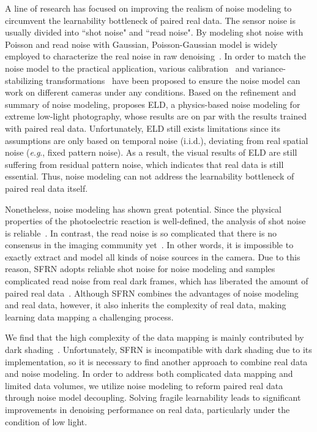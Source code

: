 \documentclass[sigconf,screen,nonacm]{acmart}
\newcommand{\eg}{\textit{e}.\textit{g}.}
\begin{document}
A line of research has focused on improving the realism of noise modeling to circumvent the learnability bottleneck of paired real data.
The sensor noise is usually divided into ``shot noise" and ``read noise".
By modeling shot noise with Poisson and read noise with Gaussian, Poisson-Gaussian model is widely employed to characterize the real noise in raw denoising~\cite{P-G}.
In order to match the noise model to the practical application, various calibration~\cite{EMVA1288,TPAMI94/CCD,P-G} and variance-stabilizing transformations~\cite{TIP11/VST,TIP13/VST} have been proposed to ensure the noise model can work on different cameras under any conditions.
Based on the refinement and summary of noise modeling, \citeauthor{CVPR20/ELD} proposes ELD, a physics-based noise modeling for extreme low-light photography, whose results are on par with the results trained with paired real data.
Unfortunately, ELD still exists limitations since its assumptions are only based on temporal noise (i.i.d.), deviating from real spatial noise (\eg, fixed pattern noise).
As a result, the visual results of ELD are still suffering from residual pattern noise, which indicates that real data is still essential.
Thus, noise modeling can not address the learnability bottleneck of paired real data itself.

Nonetheless, noise modeling has shown great potential.
Since the physical properties of the photoelectric reaction is well-defined, the analysis of shot noise is reliable~\cite{SPIE85/CCD,TPAMI94/CCD,EMVA1288}. In contrast, the read noise is so complicated that there is no consensus in the imaging community yet~\cite{SPIE04/imaging,TED07/CMOS,EMVA1288,arxiv2014/CMOS,TIP14/FPNR}.
In other words, it is impossible to exactly extract and model all kinds of noise sources in the camera.
Due to this reason, SFRN adopts reliable shot noise for noise modeling and samples complicated read noise from real dark frames, which has liberated the amount of paired real data~\cite{ICCV21/SFRN}.
Although SFRN combines the advantages of noise modeling and real data, however, it also inherits the complexity of real data, making learning data mapping a challenging process.

We find that the high complexity of the data mapping is mainly contributed by dark shading~\cite{darkshading}.
Unfortunately, SFRN is incompatible with dark shading due to its implementation, so it is necessary to find another approach to combine real data and noise modeling.
In order to address both complicated data mapping and limited data volumes, we utilize noise modeling to reform paired real data through noise model decoupling. Solving fragile learnability leads to significant improvements in denoising performance on real data, particularly under the condition of low light.
\end{document}
